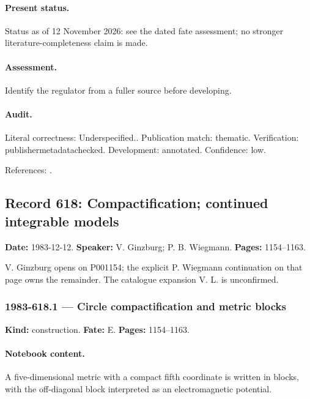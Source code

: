\paragraph{Present status.} Status as of 12 November 2026: see the dated fate assessment; no stronger literature-completeness claim is made.

\paragraph{Assessment.} Identify the regulator from a fuller source before developing.

\paragraph{Audit.} Literal correctness: Underspecified.. Publication match: thematic. Verification: publishermetadatachecked. Development: annotated. Confidence: low.

\noindent References: \citep{wiegmann1984sun,polyakovwiegmann1983goldstone}.\par

\subsection{Record 618: Compactification; continued integrable models}

\label{talk:618}

\noindent\textbf{Date:} 1983-12-12. \textbf{Speaker:} V. Ginzburg; P. B. Wiegmann. \textbf{Pages:} 1154--1163.\par

V. Ginzburg opens on P001154; the explicit P. Wiegmann continuation on that page owns the remainder. The catalogue expansion V. L. is unconfirmed.

\subsubsection{1983-618.1 --- Circle compactification and metric blocks}

\label{item:1983-618.1}

\noindent\textbf{Kind:} construction. \textbf{Fate:} E. \textbf{Pages:} 1154--1163.\par

\paragraph{Notebook content.} A five-dimensional metric with a compact fifth coordinate is written in blocks, with the off-diagonal block interpreted as an electromagnetic potential.

